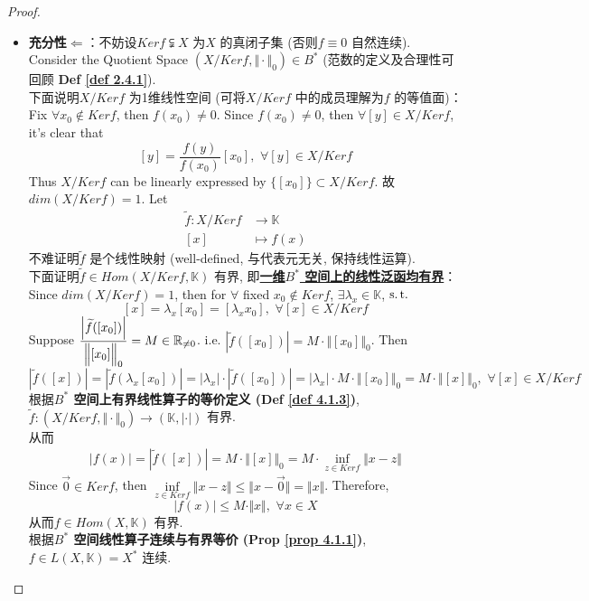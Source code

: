 \begin{proposition}
\begin{proof}
\begin{itemize}
				\item \textbf{充分性$\Leftarrow$}：不妨设$Ker f \subsetneqq X$ 为$X$ 的真闭子集 (否则$f \equiv 0$ 自然连续). \\
				Consider the Quotient Space $(X / Ker f , \Vert \cdot \Vert_0) \in B^*$ (范数的定义及合理性可回顾 \textbf{Def \ref{def 2.4.1}}). \\
				下面说明$X / Ker f$ 为1维线性空间 (可将$X / Ker f$ 中的成员理解为$f$ 的等值面)：\\
				Fix $\forall x_0 \not\in Kerf$, then $f(x_0) \neq 0$. Since $f(x_0) \neq 0$, then $\forall [y] \in X / Ker f$, it's clear that
				\[ [y] = \frac{f(y)}{f(x_0)} [x_0] , \,\, \forall [y] \in X / Ker f \]
				Thus $X / Ker f$ can be linearly expressed by $\{ [x_0] \} \subset X / Ker f$. 故$dim(X / Ker f) = 1$. Let
				\begin{align*}
					\widetilde{f} : X / Ker f &\longrightarrow \mathbb{K} \\
					[x] &\longmapsto f(x)
				\end{align*}
				不难证明$\widetilde{f}$ 是个线性映射 (well-defined, 与代表元无关, 保持线性运算). \\
				下面证明$\widetilde{f} \in Hom(X / Ker f , \mathbb{K})$ 有界, 即\underline{\textbf{一维$B^*$ 空间上的线性泛函均有界}}：\\
				Since $dim(X / Ker f) = 1$, then for $\forall$ fixed $x_0 \not\in Ker f$, $\exists \lambda_x \in \mathbb{K}$, $\operatorname{s.t.}$
				\[ [x] = \lambda_x [x_0] = [\lambda_x x_0] , \,\, \forall [x] \in X / Ker f \]
				Suppose $\dfrac{\left| \widetilde{f}([x_0]) \right|}{\Big\Vert [x_0] \Big\Vert_0} = M \in \mathbb{R}_{\neq 0}$. i.e. $\left| \widetilde{f}([x_0]) \right| = M \cdot \Big\Vert [x_0] \Big\Vert_0$. Then 
				\[ \left| \widetilde{f}([x]) \right| 
				= \left| \widetilde{f}(\lambda_x [x_0]) \right| 
				= \left| \lambda_x \right| \cdot \left| \widetilde{f}([x_0]) \right| 
				= \left| \lambda_x \right| \cdot M \cdot \Big\Vert [x_0] \Big\Vert_0 
				= M \cdot \Big\Vert [x] \Big\Vert_0 , \,\, \forall [x] \in X / Ker f \]
				根据\textbf{$B^*$ 空间上有界线性算子的等价定义 (Def \ref{def 4.1.3})}, $\widetilde{f} : (X / Ker f , \Vert \cdot \Vert_0) \longrightarrow (\mathbb{K} , | \cdot |)$ 有界. \\
				从而
				\begin{align*}
					\left| f(x) \right| 
					= \left| \widetilde{f}([x]) \right| 
					= M \cdot \Big\Vert [x] \Big\Vert_0 
					= M \cdot \inf_{z \in Ker f} \Vert x - z \Vert
				\end{align*}
				Since $\overrightarrow{0} \in Ker f$, then $\underset{z \in Ker f}{\inf} \Vert x - z \Vert \leq \Vert x - \overrightarrow{0} \Vert = \Vert x \Vert$. Therefore, 
				\[ \left| f(x) \right| \leq M \cdot \Vert x \Vert , \,\, \forall x \in X \]
				从而$f \in Hom(X , \mathbb{K})$ 有界. \\
				根据\textbf{$B^*$ 空间线性算子连续与有界等价 (Prop \ref{prop 4.1.1})}, $f \in L(X , \mathbb{K}) = X^*$ 连续. 
			\end{itemize}
		\end{proof}
	\end{proposition} 


	\ifx\allfiles\undefined

\fi